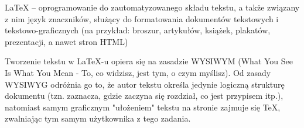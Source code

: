 \documentclass[15pt,a4paper]{article}
\begin{document}
LaTeX – oprogramowanie do zautomatyzowanego składu tekstu, a także związany z nim język znaczników, służący do formatowania dokumentów tekstowych i tekstowo-graficznych (na przykład: broszur, artykułów, książek, plakatów, prezentacji, a nawet stron HTML)

Tworzenie tekstu w LaTeX-u opiera się na zasadzie WYSIWYM (What You See Is What You Mean - To, co widzisz, jest tym, o czym myślisz). Od zasady WYSIWYG odróżnia go to, że autor tekstu określa jedynie logiczną strukturę dokumentu (tzn. zaznacza, gdzie zaczyna się rozdział, co jest przypisem itp.), natomiast samym graficznym "ułożeniem" tekstu na stronie zajmuje się TeX, zwalniając tym samym użytkownika z tego zadania.
\end{document}

